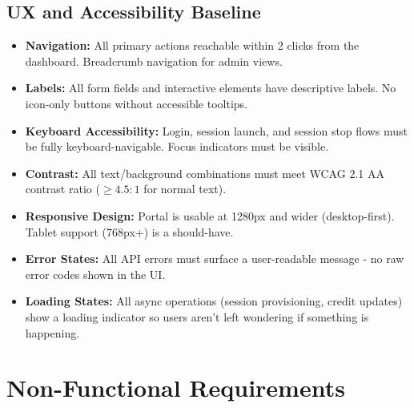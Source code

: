 \documentclass[12pt,a4paper]{article}
\begin{document}
\subsection{UX and Accessibility Baseline}

\begin{itemize}[leftmargin=1.5em]
  \item \textbf{Navigation:} All primary actions reachable within 2 clicks from the dashboard. Breadcrumb navigation for admin views.
  \item \textbf{Labels:} All form fields and interactive elements have descriptive labels. No icon-only buttons without accessible tooltips.
  \item \textbf{Keyboard Accessibility:} Login, session launch, and session stop flows must be fully keyboard-navigable. Focus indicators must be visible.
  \item \textbf{Contrast:} All text/background combinations must meet WCAG 2.1 AA contrast ratio ($\geq 4.5:1$ for normal text).
  \item \textbf{Responsive Design:} Portal is usable at 1280px and wider (desktop-first). Tablet support (768px+) is a should-have.
  \item \textbf{Error States:} All API errors must surface a user-readable message - no raw error codes shown in the UI.
  \item \textbf{Loading States:} All async operations (session provisioning, credit updates) show a loading indicator so users aren't left wondering if something is happening.
\end{itemize}

\newpage
\section{Non-Functional Requirements}
\end{document}
